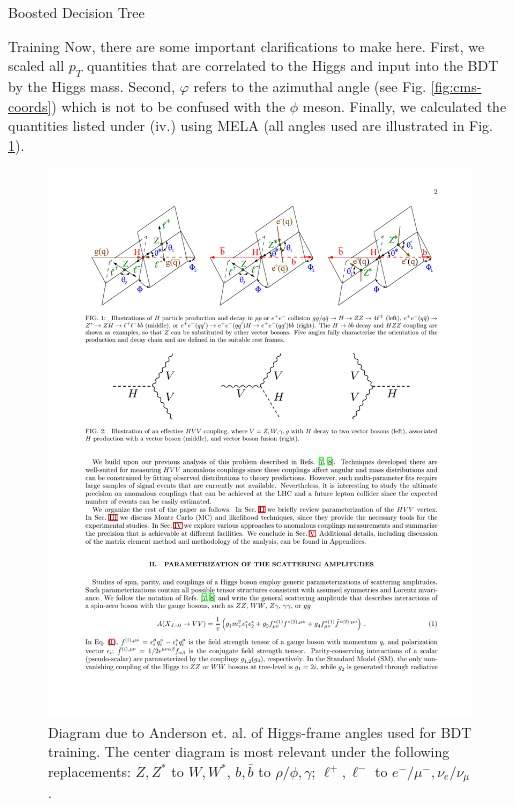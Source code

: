 \begin{section}{Boosted Decision Tree}
\begin{subsection}{Training}
\noindent Now, there are some important clarifications to make here. First, we scaled all $p_{T}$ quantities that are correlated to the Higgs and input into the BDT by the Higgs mass. Second, $\varphi$ refers to the azimuthal angle (see Fig. \ref{fig:cms-coords}) which is not to be confused with the $\phi$ meson. Finally, we calculated the quantities listed under (iv.) using MELA\cite{cite-mela} (all angles used are illustrated in Fig. \ref{fig:magic-angles}).

\begin{figure}[htb]
\begin{center}
\includegraphics[width=.95\linewidth]{Dissertation/fig/magic-angles.pdf}
\end{center}
\caption{Diagram due to Anderson et. al. \cite{magic-angles-cite} of Higgs-frame angles used for BDT training. The center diagram is most relevant under the following replacements: $Z, Z^*$ to $W, W^*$, $b, \bar{b}$ to $\rho/\phi, \gamma$; $\ell^+,\ell^-$ to $e^-/\mu^-, \nu_e/ \nu_\mu$.}
\label{fig:magic-angles}
\end{figure}


\end{subsection}
\end{section}
